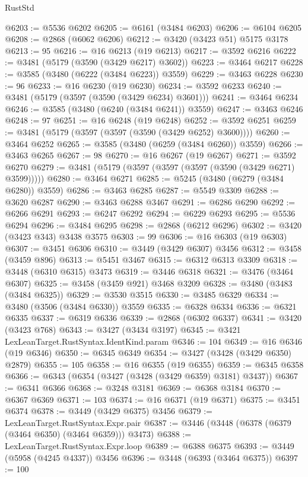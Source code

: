 \begin{lexlean}{RustStd}
\begin{coremodule}
{{{{{{{{{{{{{{{{{{{@6203 := @5536 @6202
@6205 := @6161 (@3484 @6203)
@6206 := @6104 @6205
@6208 := @2868 (@6062 @6206)
@6212 := @3420 (@3423 @51) @5175 @3178
@6213 := 95
@6216 := @16 @6213 (@19 @6213)
@6217 := @3592 @6216
@6222 := @3481 (@5179 (@3590 (@3429 @6217) @3602))
@6223 := @3464 @6217
@6228 := @3585 (@3480 (@6222 (@3484 @6223)) @3559)
@6229 := @3463 @6228
@6230 := 96
@6233 := @16 @6230 (@19 @6230)
@6234 := @3592 @6233
@6240 := @3481 (@5179 (@3597 (@3590 (@3429 @6234) @3601)))
@6241 := @3464 @6234
@6246 := @3585 (@3480 (@6240 (@3484 @6241)) @3559)
@6247 := @3463 @6246
@6248 := 97
@6251 := @16 @6248 (@19 @6248)
@6252 := @3592 @6251
@6259 := @3481 (@5179 (@3597 (@3597 (@3590 (@3429 @6252) @3600))))
@6260 := @3464 @6252
@6265 := @3585 (@3480 (@6259 (@3484 @6260)) @3559)
@6266 := @3463 @6265
@6267 := 98
@6270 := @16 @6267 (@19 @6267)
@6271 := @3592 @6270
@6279 := @3481 (@5179 (@3597 (@3597 (@3597 (@3590 (@3429 @6271) @3599)))))
@6280 := @3464 @6271
@6285 := @5245 (@3480 (@6279 (@3484 @6280)) @3559)
@6286 := @3463 @6285
@6287 := @5549 @3309
@6288 := @3620 @6287
@6290 := @3463 @6288 @3467
@6291 := @6286 @6290
@6292 := @6266 @6291
@6293 := @6247 @6292
@6294 := @6229 @6293
@6295 := @5536 @6294
@6296 := @3484 @6295
@6298 := @2868 (@6212 @6296)
@6302 := @3420 (@3423 @343) @3438 @3575
@6303 := 99
@6306 := @16 @6303 (@19 @6303)
@6307 := @3451 @6306
@6310 := @3449 (@3429 @6307) @3456
@6312 := @3458 (@3459 @896)
@6313 := @5451 @3467
@6315 := @6312 @6313 @3309
@6318 := @3448 (@6310 @6315) @3473
@6319 := @3446 @6318
@6321 := @3476 (@3464 @6307)
@6325 := @3458 (@3459 @921) @3468 @3209
@6328 := @3480 (@3483 (@3484 @6325))
@6329 := @3530 @3515
@6330 := @3485 @6329
@6334 := @3480 (@3506 (@3484 @6330)) @3559
@6335 := @6328 @6334
@6336 := @6321 @6335
@6337 := @6319 @6336
@6339 := @2868 (@6302 @6337)
@6341 := @3420 (@3423 @768)
@6343 := @3427 (@3434 @3197)
@6345 := @3421 LexLeanTarget.RustSyntax.IdentKind.param
@6346 := 104
@6349 := @16 @6346 (@19 @6346)
@6350 := @6345 @6349
@6354 := @3427 (@3428 (@3429 @6350) @2879)
@6355 := 105
@6358 := @16 @6355 (@19 @6355)
@6359 := @6345 @6358
@6366 := @6343 (@6354 (@3427 (@3428 (@3429 @6359) @3181) @3437))
@6367 := @6341 @6366
@6368 := @3248 @3181
@6369 := @6368 @3184
@6370 := @6367 @6369
@6371 := 103
@6374 := @16 @6371 (@19 @6371)
@6375 := @3451 @6374
@6378 := @3449 (@3429 @6375) @3456
@6379 := LexLeanTarget.RustSyntax.Expr.pair
@6387 := @3446 (@3448 (@6378 (@6379 (@3464 @6350) (@3464 @6359))) @3473)
@6388 := LexLeanTarget.RustSyntax.Expr.loop
@6389 := @6388 @6375
@6393 := @3449 (@5958 (@4245 @4337)) @3456
@6396 := @3448 (@6393 (@3464 @6375))
@6397 := 100
}}}}}}}}}}}}}}}}}}}
\end{coremodule}
\end{lexlean}
